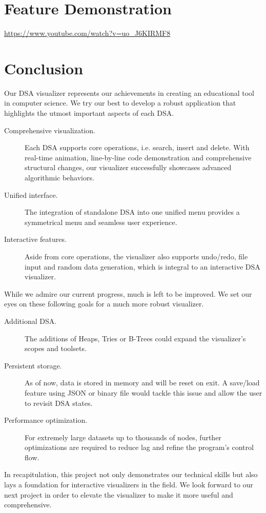 \documentclass{article}
\begin{document}
\section{Feature Demonstration}
\url{https://www.youtube.com/watch?v=uo_J6KIRMF8}

\section{Conclusion}
Our DSA visualizer represents our achievements in creating an educational tool in computer science. We try our best to develop a robust application that highlights the utmost important aspects of each DSA.
\begin{description}
	\item[Comprehensive visualization.] Each DSA supports core operations, i.e. search, insert and delete. With real-time animation, line-by-line code demonstration and comprehensive structural changes, our visualizer successfully showcases advanced algorithmic behaviors.
	\item[Unified interface.] The integration of standalone DSA into one unified menu provides a symmetrical menu and seamless user experience.
	\item[Interactive features.] Aside from core operations, the visualizer also supports undo/redo, file input and random data generation, which is integral to an interactive DSA visualizer.   
\end{description}
While we admire our current progress, much is left to be improved. We set our eyes on these following goals for a much more robust visualizer.
\begin{description}
	\item[Additional DSA.] The additions of Heaps, Tries or B-Trees could expand the visualizer's scopes and toolsets.
	\item[Persistent storage.] As of now, data is stored in memory and will be reset on exit. A save/load feature using JSON or binary file would tackle this issue and allow the user to revisit DSA states.
	\item[Performance optimization.] For extremely large datasets up to thousands of nodes, further optimizations are required to reduce lag and refine the program's control flow. 
\end{description}
In recapitulation, this project not only demonstrates our technical skills but also lays a foundation for interactive visualizers in the field. We look forward to our next project in order to elevate the visualizer to make it more useful and comprehensive.
\end{document}
